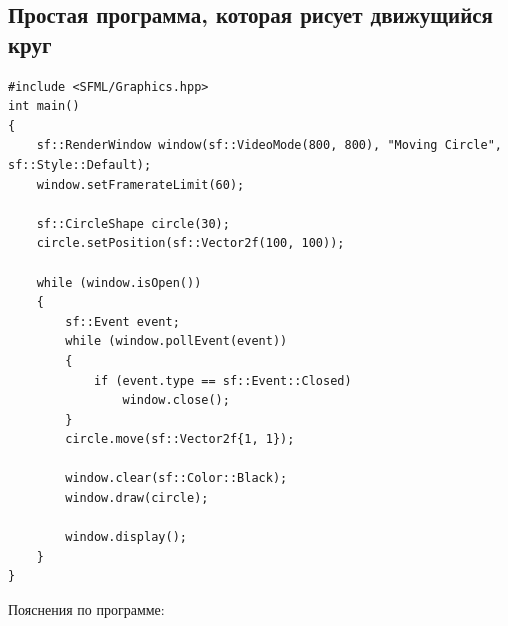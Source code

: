 \documentclass{article}
\begin{document}
\subsection*{Простая программа, которая рисует движущийся круг}
\begin{lstlisting}
#include <SFML/Graphics.hpp>
int main()
{
    sf::RenderWindow window(sf::VideoMode(800, 800), "Moving Circle", sf::Style::Default);
    window.setFramerateLimit(60);
    
    sf::CircleShape circle(30);
    circle.setPosition(sf::Vector2f(100, 100));

    while (window.isOpen())
    {
        sf::Event event;
        while (window.pollEvent(event)) 
        {
            if (event.type == sf::Event::Closed)
                window.close();
        }
        circle.move(sf::Vector2f{1, 1});

        window.clear(sf::Color::Black);
        window.draw(circle);

        window.display();
    }
}
\end{lstlisting}
Пояснения по программе:
\end{document}
